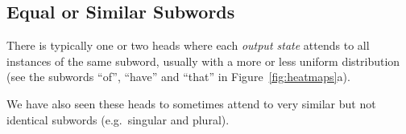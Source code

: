 \documentclass[11pt,a4paper]{article}
\newcommand\eg{e.g.\ }
\newcommand{\words}{\emph{input states}\xspace}
\newcommand{\state}{\emph{output state}\xspace}
\def\RR#1{{\color{blue}RR: \it #1}}
\def\JL#1{{\color{magenta}JL: \it #1}}
\def\DEL#1{{\color{green}SMAZAT: \it #1}}
\def\JL#1{}
\def\RR#1{}
\def\DEL#1{}
\begin{document}




\subsection{Equal or Similar Subwords}
There is typically one or two heads where each \state attends to all instances of the same subword, usually with a more or less uniform distribution (see the subwords ``of'', ``have'' and ``that'' in Figure~\ref{fig:heatmaps}a).
\RR{Hypothesis: position-independent word identity (like a bag of words).}
%
We have also seen these heads to sometimes attend to very similar but not identical subwords (\eg singular and plural).

\DEL{\subsection{Not Peaked}
Quite rarely, we see heads that are not as peaked, distributing the attention over multiple \words, usually consecutive or close to each other.
We believe that this is simply a way of obtaining a representation of a whole phrase, but we do not have any explanation for why this happens in some cases.
We frequently observe such heads only in the German-to-French translation pair.
}
\end{document}

